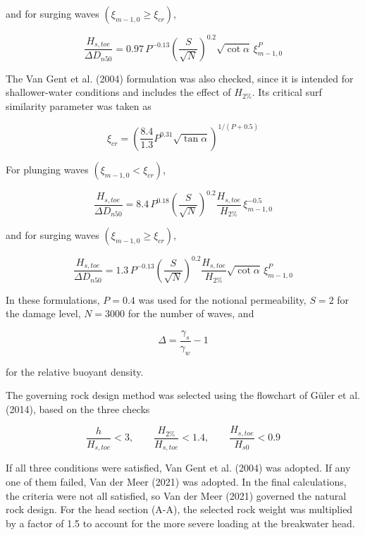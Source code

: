 \documentclass[a4paper, 11pt]{article}
\begin{document}
and for surging waves $(\xi_{m-1,0}\geq\xi_{cr})$,

\begin{equation}
    \frac{H_{s,toe}}{\Delta D_{n50}}=
    0.97\,P^{-0.13}\left(\frac{S}{\sqrt{N}}\right)^{0.2}
    \sqrt{\cot\alpha}\,\xi_{m-1,0}^{P}
\end{equation}

The Van Gent et al. (2004) formulation was also checked, since it is intended for shallower-water conditions and includes the effect of $H_{2\%}$. Its critical surf similarity parameter was taken as

\begin{equation}
    \xi_{cr}=\left(\frac{8.4}{1.3}P^{0.31}\sqrt{\tan\alpha}\right)^{1/(P+0.5)}
\end{equation}

For plunging waves $(\xi_{m-1,0}<\xi_{cr})$,

\begin{equation}
    \frac{H_{s,toe}}{\Delta D_{n50}}=
    8.4\,P^{0.18}\left(\frac{S}{\sqrt{N}}\right)^{0.2}
    \frac{H_{s,toe}}{H_{2\%}}\,\xi_{m-1,0}^{-0.5}
\end{equation}

and for surging waves $(\xi_{m-1,0}\geq\xi_{cr})$,

\begin{equation}
    \frac{H_{s,toe}}{\Delta D_{n50}}=
    1.3\,P^{-0.13}\left(\frac{S}{\sqrt{N}}\right)^{0.2}
    \frac{H_{s,toe}}{H_{2\%}}\sqrt{\cot\alpha}\,\xi_{m-1,0}^{P}
\end{equation}

In these formulations, $P=0.4$ was used for the notional permeability, $S=2$ for the damage level, $N=3000$ for the number of waves, and

\begin{equation}
    \Delta=\frac{\gamma_s}{\gamma_w}-1
\end{equation}

for the relative buoyant density.

The governing rock design method was selected using the flowchart of G\"uler et al. (2014), based on the three checks

\begin{equation}
    \frac{h}{H_{s,toe}}<3, \qquad
    \frac{H_{2\%}}{H_{s,toe}}<1.4, \qquad
    \frac{H_{s,toe}}{H_{s0}}<0.9
\end{equation}

If all three conditions were satisfied, Van Gent et al. (2004) was adopted. If any one of them failed, Van der Meer (2021) was adopted. In the final calculations, the criteria were not all satisfied, so Van der Meer (2021) governed the natural rock design. For the head section (A-A), the selected rock weight was multiplied by a factor of 1.5 to account for the more severe loading at the breakwater head.
\end{document}

